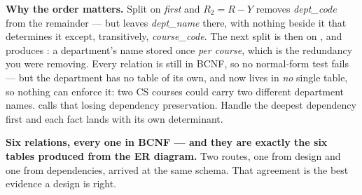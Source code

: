 \begin{worked}
\medskip
\textbf{Why the order matters.} Split on  \emph{first} and $R_2 = R - Y$ removes \textit{dept\_code} from the
remainder --- but leaves \textit{dept\_name} there, with nothing beside it that
determines it except, transitively, \textit{course\_code}. The next split is
then on , and produces
: a department's name stored
once \emph{per course}, which is the redundancy you were removing. Every
relation is still in BCNF, so no normal-form test fails --- but the department
has no table of its own, and  now lives in
\emph{no} single table, so nothing can enforce it: two CS courses could carry
two different department names.  calls that losing
dependency preservation. Handle the deepest dependency first and each fact
lands with its own determinant.

\medskip
\textbf{Six relations, every one in BCNF --- and they are exactly the six
tables  produced from the ER diagram.} Two routes, one from
design and one from dependencies, arrived at the same schema. That agreement
is the best evidence a design is right.
\end{worked}

